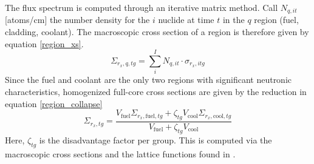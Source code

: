 The flux spectrum is computed through an iterative matrix method.  Call $N_{q,it}$ [atoms/cm] 
the number density for the $i$ nuclide at time $t$ in the $q$ region 
(fuel, cladding, coolant).  The macroscopic cross section of a region is therefore given by equation 
\ref{region_xs}.
\begin{equation}
\label{region_xs}
\Sigma_{r_x,q,tg} = \sum_i^I N_{q,it} \cdot \sigma_{r_x,itg}
\end{equation}
Since the fuel and coolant are the only two regions with significant neutronic characteristics, 
homogenized full-core cross sections are given by the reduction in equation \ref{region_collapse}
\begin{equation}
\label{region_collapse}
\Sigma_{r_x,tg} = \frac{V_{\mbox{fuel}}\Sigma_{r_x,\mbox{fuel},tg} + \zeta_{tg}V_{\mbox{cool}}\Sigma_{r_x,\mbox{cool},tg}}
                       {V_{\mbox{fuel}} + \zeta_{tg}V_{\mbox{cool}}}
\end{equation}
Here, $\zeta_{tg}$ is the disadvantage factor per group.  This is computed via the macroscopic 
cross sections and the lattice functions found in \cite{Lamarsh2002}.  


